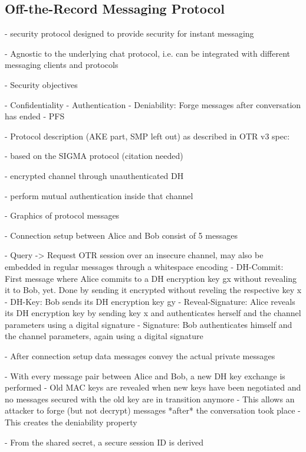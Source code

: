 \documentclass[a4paper]{article}
\begin{document}
\subsection{Off-the-Record Messaging Protocol}

- security protocol designed to provide security for instant messaging

- Agnostic to the underlying chat protocol, i.e. can be integrated with different messaging clients and protocols

- Security objectives

    - Confidentiality
    - Authentication
    - Deniability: Forge messages after conversation has ended
    - PFS

- Protocol description (AKE part, SMP left out) as described in OTR v3 spec: 

    - based on the SIGMA protocol (citation needed)

    - encrypted channel through unauthenticated DH 

    - perform mutual authentication inside that channel

    - Graphics of protocol messages

    - Connection setup between Alice and Bob consist of 5 messages

        - Query -> Request OTR session over an insecure channel, may also be embedded in regular messages through a whitespace encoding
        - DH-Commit: First message where Alice commits to a DH encryption key gx without revealing it to Bob, yet. Done by sending it encrypted without reveling the respective key x
        - DH-Key: Bob sends its DH encryption key gy
        - Reveal-Signature: Alice reveals its DH encryption key by sending key x and authenticates herself and the channel parameters using a digital signature
        - Signature: Bob authenticates himself and the channel parameters, again using a digital signature

    - After connection setup data messages convey the actual private messages

        - With every message pair between Alice and Bob, a new DH key exchange is performed
        - Old MAC keys are revealed when new keys have been negotiated and no messages secured with the old key are in transition anymore
        - This allows an attacker to forge (but not decrypt) messages *after* the conversation took place
        - This creates the deniability property

    - From the shared secret, a secure session ID is derived
\end{document}

